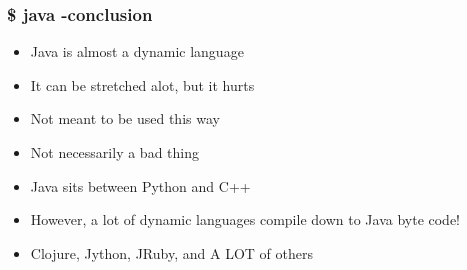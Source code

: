 \begin{frame}
  \frametitle{\$ java -conclusion}

  \vspace{0.25cm}
  \begin{itemize}
    \item Java is almost a dynamic language
    \vspace{0.4cm} 
    \item It can be stretched alot, but it hurts
    \vspace{0.4cm}      
    \item Not meant to be used this way
    \vspace{0.4cm}    
    \item Not necessarily a bad thing
    \vspace{0.4cm}
    \item Java sits between Python and C++
    \vspace{0.4cm}
    \item However, a lot of dynamic languages compile down to Java byte code!
    \vspace{0.4cm}
    \item Clojure, Jython, JRuby, and A LOT of others
  \end{itemize}
\end{frame}